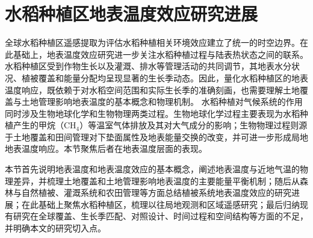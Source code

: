 
\section{水稻种植区地表温度效应研究进展}

全球水稻种植区遥感提取为评估水稻种植相关环境效应建立了统一的时空边界。在此基础上，地表温度效应研究进一步关注水稻种植过程与陆表热状态之间的联系。水稻种植区受到作物生长以及灌溉、排水等管理活动的共同调节，其地表水分状况、植被覆盖和能量分配均呈现显著的生长季动态。因此，量化水稻种植区的地表温度响应，既依赖于对水稻空间范围和实际生长季的准确刻画，也需要理解土地覆盖与土地管理影响地表温度的基本概念和物理机制。
水稻种植对气候系统的作用同时涉及生物地球化学和生物物理两类过程。生物地球化学过程主要表现为水稻种植产生的甲烷（CH$_4$）等温室气体排放及其对大气成分的影响\cite{Qian2023RiceGHG,Zhang2020NatCommun}；生物物理过程则源于土地覆盖和田间管理对下垫面属性及地表能量交换的改变，并可进一步形成局地地表温度响应\cite{Bright2017LCMC,Duveiller2018Energy}。本节聚焦后者在地表温度层面的表现。

本节首先说明地表温度和地表温度效应的基本概念，阐述地表温度与近地气温的物理差异，并梳理土地覆盖和土地管理影响地表温度的主要能量平衡机制；随后从森林与自然植被、灌溉系统和农田管理等方面总结植被系统地表温度效应的研究进展；在此基础上聚焦水稻种植区，梳理以往局地观测和区域遥感研究；最后归纳现有研究在全球覆盖、生长季匹配、对照设计、时间过程和空间结构等方面的不足，并明确本文的研究切入点。

